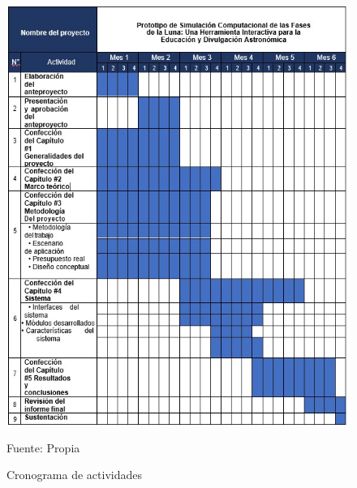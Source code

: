\begin{figure}[H]
  \centering
  \includegraphics[scale=0.9]{Imagenes/cronograma.png}
  \caption{Cronograma de actividades}{Fuente: Propia}
\end{figure}
